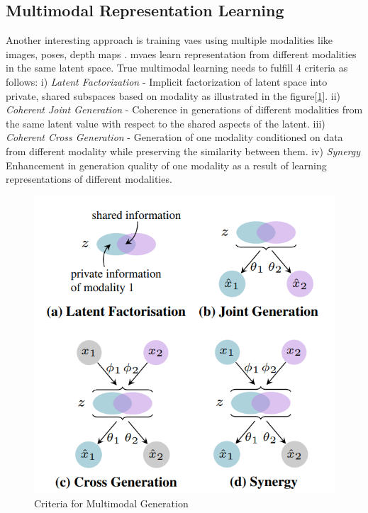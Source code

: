 \subsection{Multimodal Representation Learning}
\label{section:multimodal_representation_learning}
Another interesting approach is training \ac{vae}s using multiple modalities like images, poses, depth maps \cite{CrossingNets, crossmodal, MMVAE,HandDisentangled}. \ac{mvae}s learn representation from different modalities in the same latent space. True multimodal learning needs to fulfill 4 criteria as follows: i) \textit{Latent Factorization} - Implicit factorization of latent space into private, shared subspaces based on modality as illustrated in the figure[\ref{fig:criteria}]. ii) \textit{Coherent Joint Generation} - Coherence in generations of different modalities from the same latent value with respect to the shared aspects of the latent. iii) \textit{Coherent Cross Generation} - Generation of one modality conditioned on data from different modality while preserving the similarity between them. iv) \textit{Synergy} Enhancement in generation quality of one modality as a result of learning representations of different modalities.

\begin{figure}[!h]
    \centering
    \includegraphics[scale=0.4]{figures/criteria.png}
    \caption{Criteria for Multimodal Generation \cite{MMVAE}}
    \label{fig:criteria}
\end{figure}

